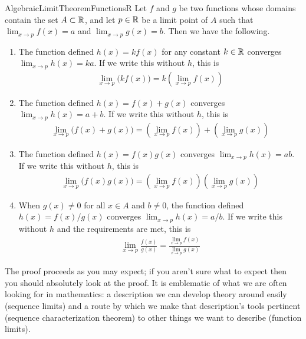 \documentclass[11pt]{article}
\begin{document}
\begin{label theorem}{AlgebraicLimitTheoremFunctionsR}
Let $f$ and $g$ be two functions whose domains contain the set $A \subset \mathbb{R}$, and let $p \in \mathbb{R}$ be a limit point of $A$ such that $\lim_{x\to p}f(x) = a$ and $\lim_{x\to p}g(x) = b$. Then we have the following. \begin{enumerate}
\item The function defined $h(x) = k f(x)$ for any constant $k \in \mathbb{R}$ converges $\lim_{x \to p} h(x) = ka$. If we write this without $h$, this is \begin{gather*}
\lim_{x\to p} \big(k f(x) \big) = k \left( \lim_{x\to p} f(x) \right)
\end{gather*}
\item The function defined $h(x) = f(x) + g(x)$ converges $\lim_{x \to p} h(x) = a + b$. If we write this without $h$, this is \begin{gather*}
\lim_{x \to p} \big(f(x) + g(x) \big) = \left( \lim_{x\to p} f(x) \right) + \left( \lim_{x \to p} g(x) \right)
\end{gather*}
\item The function defined $h(x) = f(x) g(x)$ converges $\lim_{x \to p} h(x) = a b$. If we write this without $h$, this is \begin{gather*}
\lim_{x \to p} \big( f(x)g(x) \big) = \left( \lim_{x \to p} f(x) \right) \left( \lim_{x\to p} g(x) \right)
\end{gather*}
\item When $g(x) \neq 0$ for all $x \in A$ and $b \neq 0$, the function defined $h(x) = f(x) / g(x)$ converges $\lim_{x \to p} h(x) = a/b$. If we write this without $h$ and the requirements are met, this is \begin{gather*}
\lim_{x \to p} \frac{f(x)}{g(x)} = \frac{\lim_{x \to p} f(x) }{\lim_{x \to p} g(x)}
\end{gather*}
\end{enumerate}
\end{label theorem}

The proof proceeds as you may expect; if you aren't sure what to expect then you should absolutely look at the proof. It is emblematic of what we are often looking for in mathematics: a description we can develop theory around easily (sequence limits) and a route by which we make that description's tools pertinent (sequence characterization theorem) to other things we want to describe (function limits).
\end{document}
